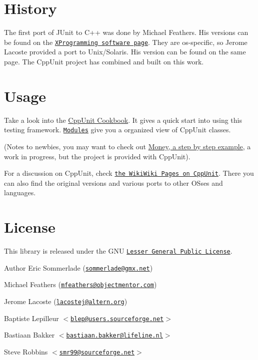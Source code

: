 \hypertarget{index__history}{}\section{History}\label{index__history}
The first port of JUnit to C++ was done by Michael Feathers. His versions can be found on the \href{http://www.xprogramming.com/software.htm}{\tt XProgramming software page}. They are os-\/specific, so Jerome Lacoste provided a port to Unix/Solaris. His version can be found on the same page. The CppUnit project has combined and built on this work.\hypertarget{index__usage}{}\section{Usage}\label{index__usage}
Take a look into the \hyperlink{cppunit_cookbook}{CppUnit Cookbook}. It gives a quick start into using this testing framework. \href{modules.html}{\tt Modules} give you a organized view of CppUnit classes.

(Notes to newbies, you may want to check out \hyperlink{money_example}{Money, a step by step example}, a work in progress, but the project is provided with CppUnit).

For a discussion on CppUnit, check \href{http://c2.com/cgi/wiki?CppUnit}{\tt the WikiWiki Pages on CppUnit}. There you can also find the original versions and various ports to other OSses and languages.\hypertarget{index__license}{}\section{License}\label{index__license}
This library is released under the GNU \href{http://www.gnu.org/copyleft/lesser.html}{\tt Lesser General Public License}.

\begin{DoxyAuthor}{Author}
Eric Sommerlade (\href{mailto:sommerlade@gmx.net}{\tt sommerlade@gmx.net}) 

Michael Feathers (\href{mailto:mfeathers@objectmentor.com}{\tt mfeathers@objectmentor.com}) 

Jerome Lacoste (\href{mailto:lacostej@altern.org}{\tt lacostej@altern.org}) 

Baptiste Lepilleur $<$\href{mailto:blep@users.sourceforge.net}{\tt blep@users.sourceforge.net}$>$ 

Bastiaan Bakker $<$\href{mailto:bastiaan.bakker@lifeline.nl}{\tt bastiaan.bakker@lifeline.nl}$>$ 

Steve Robbins $<$\href{mailto:smr99@sourceforge.net}{\tt smr99@sourceforge.net}$>$ 
\end{DoxyAuthor}
